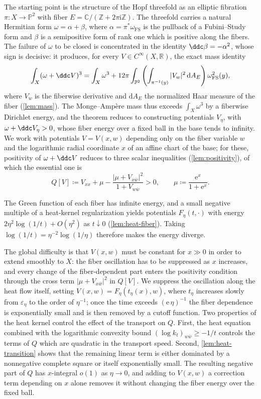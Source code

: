 \documentclass[11pt,a4paper]{article}
\begin{document}
	The starting point is the structure of the Hopf threefold as an
	elliptic fibration $\pi\colon X\to\mathbb P^2$ with fiber
	$E=\mathbb C/(\mathbb Z+2\pi\mathrm{i}\mathbb Z)$.  The threefold
	carries a natural Hermitian form $\omega=\alpha+\beta$, where
	$\alpha=\pi^*\omega_{\mathrm{FS}}$ is the pullback of a Fubini--Study
	form and $\beta$ is a semipositive form of rank one which is positive
	along the fibers.  The failure of $\omega$ to be closed is concentrated
	in the identity $\ddc\beta=-\alpha^2$, whose sign is decisive: it
	produces, for every $V\in C^\infty(X,\mathbb R)$, the exact mass
	identity
	\[
	\int_X(\omega+\ddc V)^3
	=\int_X\omega^3+12\pi\int_{\mathbb P^2}
	\left(\int_{\pi^{-1}(y)}|V_w|^2\,\mathrm{d}A_E\right)
	\omega_{\mathrm{FS}}^2(y),
	\]
	where $V_w$ is the fiberwise derivative and $\mathrm{d}A_E$ the
	normalized Haar measure of the fiber (\cref{lem:mass}).  The
	Monge--Amp\`ere mass thus exceeds $\int_X\omega^3$ by a fiberwise
	Dirichlet energy, and the theorem reduces to constructing potentials
	$V_\eta$, with $\omega+\ddc V_\eta>0$, whose fiber energy over a fixed
	ball in the base tends to infinity.  We work with potentials
	$V=V(x,w)$ depending only on the fiber variable $w$ and the logarithmic
	radial coordinate $x$ of an affine chart of the base; for these,
	positivity of $\omega+\ddc V$ reduces to three scalar inequalities
	(\cref{lem:positivity}), of which the essential one is
	\[
	Q[V]\coloneqq V_{xx}+\mu-\frac{|\mu+V_{x\bar w}|^2}{1+V_{w\bar w}}>0,
	\qquad
	\mu\coloneqq\frac{\mathrm{e}^x}{1+\mathrm{e}^x}.
	\]
	
	The Green function of each fiber has infinite
	energy, and a small negative multiple of a heat-kernel regularization
	yields potentials $F_\eta(t,\cdot)$ with energy
	$2\eta^2\log(1/t)+O(\eta^2)$ as $t\downarrow0$
	(\cref{lem:heat-fiber}).  Taking
	$\log(1/t)=\eta^{-2}\log(1/\eta)$ therefore makes the energy diverge.
	
	The global difficulty is that $V(x,w)$ must be constant for $x\gg0$ in
	order to extend smoothly to $X$: the fiber oscillation has to be
	suppressed as $x$ increases, and every change of the fiber-dependent part
	enters the positivity condition through the cross term
	$|\mu+V_{x\bar w}|^2$ in $Q[V]$.  We suppress the oscillation along
	the heat flow itself, setting $V(x,w)=F_\eta(t_\eta(x),w)$, where
	$t_\eta$ increases slowly from
	$\varepsilon_\eta$ to the order of $\eta^{-1}$; once the time exceeds
	$(\mathrm{e}\,\eta)^{-1}$ the fiber dependence is exponentially small
	and is then removed by a cutoff function.  Two properties of the heat kernel
	control the effect of the transport on $Q$.  First, the heat
	equation combined with the logarithmic convexity bound
	$(\log k_t)_{w\bar w}\ge-1/t$ controls the terms of $Q$ which are
	quadratic in the transport speed.  Second, \cref{lem:heat-transition}
	shows that the remaining
	linear term is either dominated by a nonnegative complete square or
	itself exponentially small.  The resulting negative part of $Q$ has
	$x$-integral $o(1)$ as $\eta\to0$, and adding to $V(x,w)$ a correction term
	depending on $x$ alone removes it without changing the fiber energy
	over the fixed ball.
	
\end{document}
